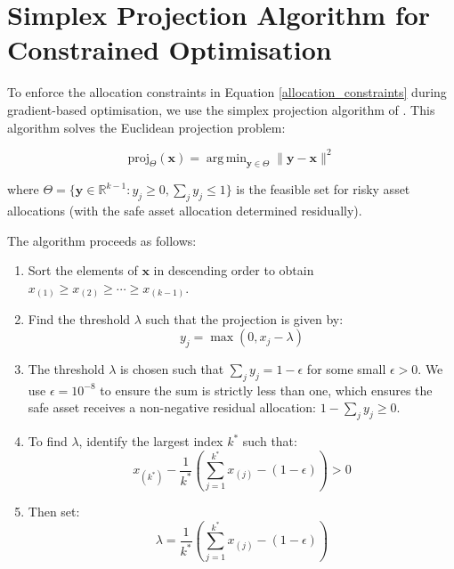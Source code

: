 \documentclass[11pt]{article}
\DeclareMathOperator*{\argmin}{arg\,min}
\begin{document}
\pagebreak

\appendix
\section{Simplex Projection Algorithm for Constrained Optimisation}
\label{appendix:simplex_projection}

To enforce the allocation constraints in Equation \ref{allocation_constraints} during gradient-based optimisation, we use the simplex projection algorithm of \textcite{duchi2008efficient}. This algorithm solves the Euclidean projection problem:

\begin{equation}\label{simplex_projection_problem_appendix}
\text{proj}_{\Theta}(\mathbf{x}) = \argmin_{\mathbf{y} \in \Theta} \|\mathbf{y} - \mathbf{x}\|^2
\end{equation}

where \(\Theta = \{\mathbf{y} \in \mathbb{R}^{k-1} : y_j \geq 0, \sum_j y_j \leq 1\}\) is the feasible set for risky asset allocations (with the safe asset allocation determined residually).

The algorithm proceeds as follows:

\begin{enumerate}
    \item Sort the elements of \(\mathbf{x}\) in descending order to obtain \(x_{(1)} \geq x_{(2)} \geq \cdots \geq x_{(k-1)}\).
    
    \item Find the threshold \(\lambda\) such that the projection is given by:
    \begin{equation}\label{simplex_projection_formula_appendix}
    y_j = \max(0, x_j - \lambda)
    \end{equation}
    
    \item The threshold \(\lambda\) is chosen such that \(\sum_j y_j = 1 - \epsilon\) for some small \(\epsilon > 0\). We use \(\epsilon = 10^{-8}\) to ensure the sum is strictly less than one, which ensures the safe asset receives a non-negative residual allocation: \(1 - \sum_j y_j \geq 0\).
    
    \item To find \(\lambda\), identify the largest index \(k^*\) such that:
    \begin{equation}\label{threshold_condition_appendix}
    x_{(k^*)} - \frac{1}{k^*}\left(\sum_{j=1}^{k^*} x_{(j)} - (1-\epsilon)\right) > 0
    \end{equation}
    
    \item Then set:
    \begin{equation}\label{threshold_value_appendix}
    \lambda = \frac{1}{k^*}\left(\sum_{j=1}^{k^*} x_{(j)} - (1-\epsilon)\right)
    \end{equation}
\end{enumerate}
\end{document}
